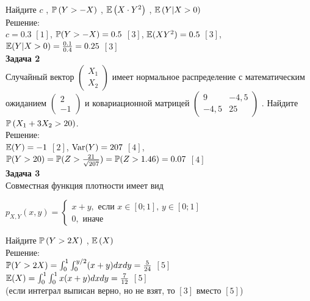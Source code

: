 \documentclass[12pt, a4paper]{article}\usepackage[]{graphicx}\usepackage[]{color}
\begin{document}
Найдите  $c$ ,  $\P\left(Y>-X\right)$ ,  $\E\left(X\cdot Y^{2}
\right)$ ,  $\E\left(Y|X>0\right)$ \\
Решение: \\
$c=0.3$ $[1]$, $\P(Y>-X)=0.5$ $[3]$, $\E(XY^{2})=0.5$ $[3]$,
$\E(Y|X>0)=\frac{0.1}{0.4}=0.25$ $[3]$ \\

\textbf{Задача 2} \\ %
Случайный вектор  $\left(\begin{array}{c}
{X_{1} } \\ {X_{2} }
\end{array}\right)$  имеет нормальное распределение с
математическим ожиданием  $\left(\begin{array}{c} {2} \\ {-1}
\end{array}\right)$  и ковариационной матрицей
$\left(\begin{array}{cc} {9} & {-4,5} \\ {-4,5} & {25}
\end{array}\right)$ . Найдите  $\P\left(X_{1} +3X_{2} >20\right)$.
\\
Решение: \\
$\E(Y)=-1$ $[2]$, $\Var(Y)=207$ $[4]$,
$\P(Y>20)=\P(Z>\frac{21}{\sqrt{207}})=\P(Z>1.46)=0.07$ $[4]$ \\

\textbf{Задача 3} \\ %
Совместная функция плотности имеет вид

$p_{X,Y} \left(x,y\right)=\left\{\begin{array}{l} {x+y,
\text{ если } x\in \left[0;1\right],\, y\in \left[0;1\right]} \\
{0,\text{ иначе} } \end{array}\right. $

Найдите  $\P\left(Y>2X\right)$ ,  $\E\left(X\right)$ \\
Решение: \\
$\P(Y>2X)=\int_{0}^{1}\int_{0}^{y/2}(x+y)dxdy=\frac{5}{24}$ $[5]$\\
$\E(X)=\int_{0}^{1}\int_{0}^{1}x(x+y)dxdy=\frac{7}{12}$ $[5]$\\
(если интеграл выписан верно, но не взят, то $[3]$ вместо $[5]$)
\\
\end{document}
